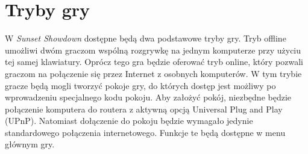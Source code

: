 \section{Tryby gry}
W \emph{Sunset Showdown} dostępne będą dwa podstawowe tryby gry. Tryb offline umożliwi dwóm graczom wspólną rozgrywkę na jednym komputerze przy użyciu tej samej klawiatury. Oprócz tego gra będzie oferować tryb online, który pozwali graczom na połączenie się przez Internet z osobnych komputerów. W tym trybie gracze będą mogli tworzyć pokoje gry, do których dostęp jest możliwy po wprowadzeniu specjalnego kodu pokoju. Aby założyć pokój, niezbędne będzie połączenie komputera do routera z aktywną opcją Universal Plug and Play (UPnP). Natomiast dołączenie do pokoju będzie wymagało jedynie standardowego połączenia internetowego. Funkcje te będą dostępne w menu głównym gry.





